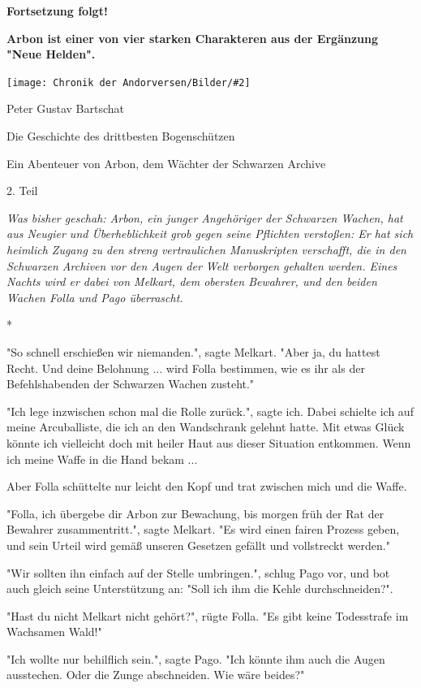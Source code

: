 \documentclass[10pt, a4paper, oneside]{book}
\newcommand{\bildmitts}[2][height=0.32\textwidth,width=0.48\textwidth,keepaspectratio]{%
    \begin{center}
        \texttt{[image: Chronik der Andorversen/Bilder/\#2]}
    \end{center}
}
\begin{document}
\begin{multicols}{2}
\textbf{Fortsetzung folgt!}\bigskip

\textbf{Arbon ist einer von vier starken Charakteren aus der Ergänzung "Neue Helden".}\bigskip

\bildmitts{Die Geschichte des drittbesten Bogenschützen Bild 2.jpg}

Peter Gustav Bartschat

Die Geschichte des drittbesten Bogenschützen

Ein Abenteuer von Arbon, dem Wächter der Schwarzen Archive

2. Teil\bigskip

\textit{Was bisher geschah: Arbon, ein junger Angehöriger der Schwarzen Wachen, hat aus Neugier und Überheblichkeit grob gegen seine Pflichten verstoßen: Er hat sich heimlich Zugang zu den streng vertraulichen Manuskripten verschafft, die in den Schwarzen Archiven vor den Augen der Welt verborgen gehalten werden. Eines Nachts wird er dabei von Melkart, dem obersten Bewahrer, und den beiden Wachen Folla und Pago überrascht.}

\begin{center}
    *
\end{center}

"So schnell erschießen wir niemanden.", sagte Melkart. "Aber ja, du hattest Recht. Und deine Belohnung ... wird Folla bestimmen, wie es ihr als der Befehlshabenden der Schwarzen Wachen zusteht."

"Ich lege inzwischen schon mal die Rolle zurück.", sagte ich. Dabei schielte ich auf meine Arcuballiste, die ich an den Wandschrank gelehnt hatte. Mit etwas Glück könnte ich vielleicht doch mit heiler Haut aus dieser Situation entkommen. Wenn ich meine Waffe in die Hand bekam ...

Aber Folla schüttelte nur leicht den Kopf und trat zwischen mich und die Waffe.

"Folla, ich übergebe dir Arbon zur Bewachung, bis morgen früh der Rat der Bewahrer zusammentritt.", sagte Melkart. "Es wird einen fairen Prozess geben, und sein Urteil wird gemäß unseren Gesetzen gefällt und vollstreckt werden."

"Wir sollten ihn einfach auf der Stelle umbringen.", schlug Pago vor, und bot auch gleich seine Unterstützung an: "Soll ich ihm die Kehle durchschneiden?".

"Hast du nicht Melkart nicht gehört?", rügte Folla. "Es gibt keine Todesstrafe im Wachsamen Wald!"

"Ich wollte nur behilflich sein.", sagte Pago. "Ich könnte ihm auch die Augen ausstechen. Oder die Zunge abschneiden. Wie wäre beides?"


\end{multicols}
\end{document}
